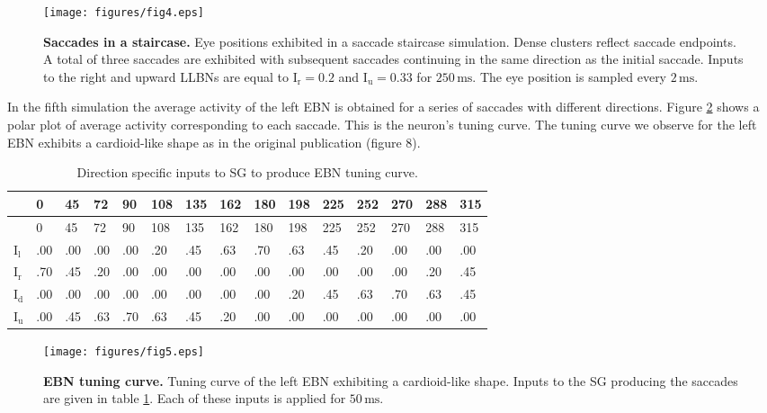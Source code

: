 \documentclass[10pt,a4paper,onecolumn]{article}
\renewcommand{\includegraphics}[2][]{\OldIncludegraphics[width=12cm, #1]{#2}}
\begin{document}
\begin{figure}
\centering
\texttt{[image: figures/fig4.eps]}
\caption{\textbf{Saccades in a staircase.} Eye positions exhibited in a
saccade staircase simulation. Dense clusters reflect saccade endpoints.
A total of three saccades are exhibited with subsequent saccades
continuing in the same direction as the initial saccade. Inputs to the
right and upward LLBNs are equal to \(\mathrm{{I}_{r}=0.2}\) and
\(\mathrm{{I}_{u}=0.33}\) for \(250\,\mathrm{ms}\). The eye position is
sampled every \(2\,\mathrm{ms}\).\label{fig:fig_4}}
\end{figure}


In the fifth simulation the average activity of the left EBN is obtained
for a series of saccades with different directions. Figure
\ref{fig:fig_5} shows a polar plot of average activity corresponding to
each saccade. This is the neuron's tuning curve. The tuning curve we
observe for the left EBN exhibits a cardioid-like shape as in the
original publication (figure 8).

\begin{longtable}[]{@{}lllllllllllllll@{}}
\caption{Direction specific inputs to SG to produce EBN tuning curve.
\label{tbl:table_1}}\tabularnewline
\toprule
& 0 & 45 & 72 & 90 & 108 & 135 & 162 & 180 & 198 & 225 & 252 & 270 & 288
& 315\tabularnewline
\midrule
\endfirsthead
\toprule
& 0 & 45 & 72 & 90 & 108 & 135 & 162 & 180 & 198 & 225 & 252 & 270 & 288
& 315\tabularnewline
\midrule
\endhead
\(\mathrm{{I}_{l}}\) & .00 & .00 & .00 & .00 & .20 & .45 & .63 & .70 &
.63 & .45 & .20 & .00 & .00 & .00\tabularnewline
\(\mathrm{{I}_{r}}\) & .70 & .45 & .20 & .00 & .00 & .00 & .00 & .00 &
.00 & .00 & .00 & .00 & .20 & .45\tabularnewline
\(\mathrm{{I}_{d}}\) & .00 & .00 & .00 & .00 & .00 & .00 & .00 & .00 &
.20 & .45 & .63 & .70 & .63 & .45\tabularnewline
\(\mathrm{{I}_{u}}\) & .00 & .45 & .63 & .70 & .63 & .45 & .20 & .00 &
.00 & .00 & .00 & .00 & .00 & .00\tabularnewline
\bottomrule
\end{longtable}

\begin{figure}
\centering
\texttt{[image: figures/fig5.eps]}
\caption{\textbf{EBN tuning curve.} Tuning curve of the left EBN
exhibiting a cardioid-like shape. Inputs to the SG producing the
saccades are given in table \ref{tbl:table_1}. Each of these inputs is
applied for \(50\,\mathrm{ms}\).\label{fig:fig_5}}
\end{figure}
\end{document}

